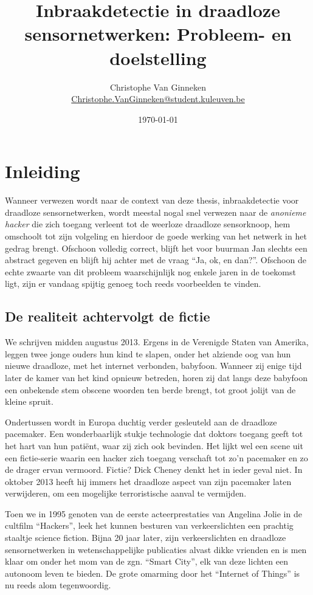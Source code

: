 \documentclass[12pt,a4paper,draft]{article}
\author{Christophe Van Ginneken\\\url{Christophe.VanGinneken@student.kuleuven.be}}
\title{Inbraakdetectie in draadloze sensornetwerken: Probleem- en doelstelling}
\date{\today}
\begin{document}
\maketitle

\section*{Inleiding}

Wanneer verwezen wordt naar de context van deze thesis, inbraakdetectie voor
draadloze sensornetwerken, wordt meestal nogal snel verwezen naar de
\emph{anonieme hacker} die zich toegang verleent tot de weerloze draadloze
sensorknoop, hem omschoolt tot zijn volgeling en hierdoor de goede werking van
het netwerk in het gedrag brengt. Ofschoon volledig correct, blijft het voor
buurman Jan slechts een abstract gegeven en blijft hij achter met de vraag
``Ja, ok, en dan?''. Ofschoon de echte zwaarte van dit probleem waarschijnlijk
nog enkele jaren in de toekomst ligt, zijn er vandaag spijtig genoeg toch reeds
voorbeelden te vinden.

\subsection*{De realiteit achtervolgt de fictie}

We schrijven midden augustus 2013. Ergens in de Verenigde Staten van Amerika,
leggen twee jonge ouders hun kind te slapen, onder het alziende oog van hun
nieuwe draadloze, met het internet verbonden, babyfoon. Wanneer zij enige tijd
later de kamer van het kind opnieuw betreden, horen zij dat langs deze babyfoon
een onbekende stem obscene woorden ten berde brengt, tot groot jolijt van de
kleine spruit.

Ondertussen wordt in Europa duchtig verder gesleuteld aan de draadloze
pacemaker. Een wonderbaarlijk stukje technologie dat doktors toegang geeft tot
het hart van hun pati\"ent, waar zij zich ook bevinden. Het lijkt wel een scene
uit een fictie-serie waarin een hacker zich toegang verschaft tot zo'n
pacemaker en zo de drager ervan vermoord. Fictie? Dick Cheney denkt het in
ieder geval niet. In oktober 2013 heeft hij immers het draadloze aspect van
zijn pacemaker laten verwijderen, om een mogelijke terroristische aanval te
vermijden.

Toen we in 1995 genoten van de eerste acteerprestaties van Angelina Jolie in de
cultfilm ``Hackers'', leek het kunnen besturen van verkeerslichten een prachtig
staaltje science fiction. Bijna 20 jaar later, zijn verkeerslichten en
draadloze sensornetwerken in wetenschappelijke publicaties alvast dikke
vrienden en is men klaar om onder het mom van de zgn. ``Smart City'', elk van
deze lichten een autonoom leven te bieden. De grote omarming door het
``Internet of Things'' is nu reeds alom tegenwoordig.
\end{document}
